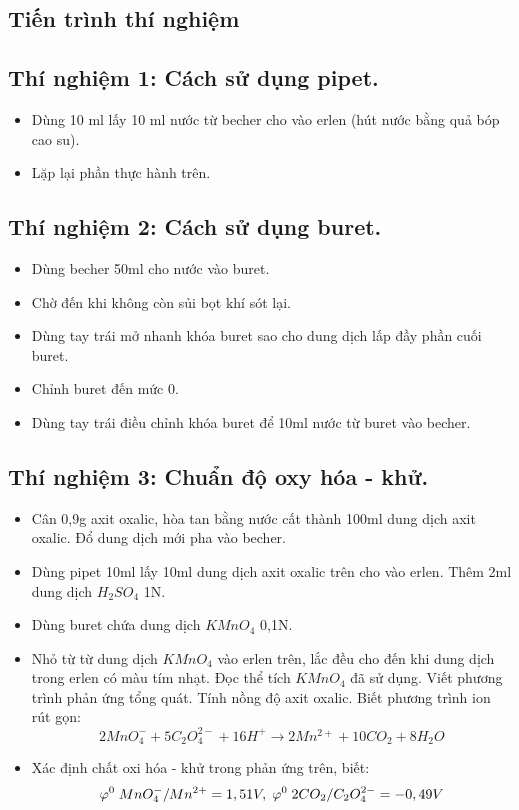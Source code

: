\documentclass[12pt,a4paper]{report}
\begin{document}
\subsection{Tiến trình thí nghiệm}
    \subsection*{Thí nghiệm 1: Cách sử dụng pipet.}

        \begin{itemize}
            \item Dùng 10 ml lấy 10 ml nước từ becher cho vào erlen (hút nước bằng quả bóp cao su).
            \item Lặp lại phần thực hành trên. 
        \end{itemize}
    \subsection* {Thí nghiệm 2: Cách sử dụng buret.}

   
        \begin{itemize}
            \item Dùng becher 50ml cho nước vào buret.
            \item Chờ đến khi không còn sủi bọt khí sót lại.
            \item Dùng tay trái mở nhanh khóa buret sao cho dung dịch lấp đầy phần cuối buret.
            \item Chỉnh buret đến mức 0.
            \item Dùng tay trái điều chỉnh khóa buret để 10ml nước từ buret vào becher.
        \end{itemize}
\subsection* {Thí nghiệm 3: Chuẩn độ oxy hóa - khử.}

  
        \begin{itemize}
            \item Cân 0,9g axit oxalic, hòa tan bằng nước cất thành 100ml dung dịch axit oxalic. Đổ dung dịch mới pha vào becher.
            \item Dùng pipet 10ml lấy 10ml dung dịch axit oxalic trên cho vào erlen. Thêm 2ml dung dịch $H_2SO_4$ 1N.
            \item Dùng buret chứa dung dịch $KMnO_4$ 0,1N.
            \item Nhỏ từ từ dung dịch $KMnO_4$ vào erlen trên, lắc đều cho đến khi dung dịch trong erlen có màu tím nhạt. Đọc thể tích $KMnO_4$ đã sử dụng. Viết phương trình phản ứng tổng quát. Tính nồng độ axit oxalic. Biết phương trình ion rút gọn: \[2MnO_4^- + 5C_2O_4^{2-} + 16H^+ \rightarrow 2Mn^{2+} + 10CO_2+ 8H_2O\]
            \item Xác định chất oxi hóa - khử trong phản ứng trên, biết: \[\varphi^0\thickspace MnO_4^- /Mn^{2+} = 1,51V,\thickspace  \varphi^0 \thickspace 2CO_2/C_2O_4^{2-} = -0,49V\]
        \end{itemize}
\end{document}
